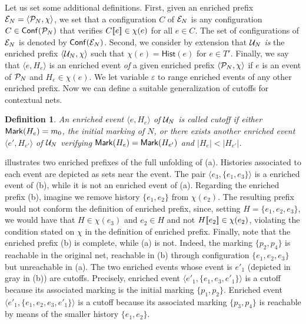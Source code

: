 \documentclass[11pt,a4paper]{article}
\newtheorem{definition}{Definition}
\newcommand{\hist}[1]{\ensuremath{\mathsf{Hist}(#1)}}
\newcommand{\conf}[1]{\ensuremath{\mathsf{Conf}(#1)}}
\begin{document}
Let us set some additional definitions. First, given an enriched prefix $\mathcal{E}_{N}
= \langle \mathcal{P}_{N}, \chi \rangle$, we set that a configuration $C$ of $\mathcal{E}_{N}$
is any configuration $C \in \conf{\pref N}$ that verifies $C [\![ e]\!] \in \chi
(e)$ for all $e \in C$.  The set of configurations of $\mathcal{E}_{N}$ is denoted by
$\conf{\enr N}$.  Second, we consider by extension that $\mathcal{U}_{N}$ \emph{is} the
enriched prefix $\langle \mathcal{U}_{N}, \chi \rangle$ such that $\chi (e) = \hist{e}$
for $e \in T'$.  Finally, we say that $\langle e, H_e \rangle$ is an enriched
event \emph{of} a given enriched prefix $\langle \mathcal{P}_{N}, \chi \rangle$ if $e$
is an event of $\mathcal{P}_{N}$ and $H_e \in \chi (e)$.  We let variable $\varepsilon$
to range enriched events of any other enriched prefix.  Now we can define a
suitable generalization of cutoffs for contextual nets.

\begin{definition}
An enriched event $\langle e, H_e \rangle$ of $\mathcal{U}_{N}$ is called \emph{cutoff}
if either $\mathsf{Mark }{(H_e)} = m_0$, the initial marking of $N$, or there exists
another enriched event $\langle e', H_{e'} \rangle$ of $\mathcal{U}_{N}$ verifying
$\mathsf{Mark }{(H_e)} = \mathsf{Mark }{(H_{e'})}$ and $|H_e| < |H_{e'}|$.
\end{definition}

 illustrates two enriched prefixes of the full unfolding of
 (a).  Histories associated to each event are depicted as sets
near the event.  The pair $\langle e_3, \{e_1, e_3\} \rangle$ is a enriched
event of (b), while it is not an enriched event of (a).  Regarding the enriched
prefix (b), imagine we remove history $\{e_1, e_2\}$ from $\chi (e_2)$.  The
resulting prefix would not conform the definition of enriched prefix, since,
setting $H = \{e_1, e_2, e_3\}$, we would have that $H \in \chi (e_3)$ and $e_2
\in H$ and not $H [\![ e_2]\!] \in \chi (e_2)$, violating the condition stated on
$\chi$ in the definition of enriched prefix.  Finally, note that the enriched
prefix (b) is complete, while (a) is not.  Indeed, the marking $\{p_2, p_4\}$
is reachable in the original net, reachable in (b) through configuration
$\{e_1, e_2, e_3\}$ but unreachable in (a).  The two enriched events whose
event is $e'_1$ (depicted in gray in (b)) are cutoffs.  Precisely, enriched
event $\langle e'_1, \{e_1, e_3, e'_1\} \rangle$ is a cutoff because its
associated marking is the initial marking $\{p_1, p_2\}$.  Enriched event
$\langle e'_1, \{e_1, e_2, e_3, e'_1\} \rangle$ is a cutoff because its
associated marking $\{p_3, p_4\}$ is reachable by means of the smaller history
$\{e_1, e_2\}$.
\end{document}
